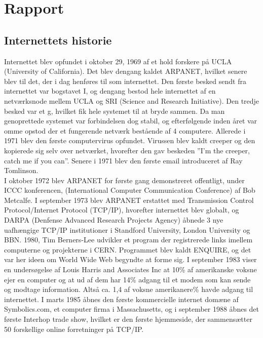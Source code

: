 \chapter{Rapport}

    \section{Internettets historie}
        Internettet blev opfundet i oktober 29, 1969 af et hold forskere på UCLA (University of California). Det blev dengang kaldet ARPANET, hvilket senere blev til det, der i dag henføres til som internettet. 
        Den første besked sendt fra internettet var bogstavet I, og dengang bestod hele internettet af en netværksnode mellem UCLA og SRI (Science and Research Initiative). 
        Den tredje besked var et g, hvilket fik hele systemet til at bryde sammen. 
        Da man genoprettede systemet var forbindelsen dog stabil, og efterfølgende inden året var omme opstod der et fungerende netværk bestående af 4 computere.
        Allerede i 1971 blev den første computervirus opfundet. Virussen blev kaldt creeper og den kopierede sig selv over netværket, hvorefter den gav beskeden ”I’m the creeper, catch me if you can”. Senere i 1971 blev den første email introduceret af Ray Tomlinson.\\
        I oktober 1972 blev ARPANET for første gang demonstreret offentligt, under ICCC konferencen, (International Computer Communication Conference) af Bob Metcalfe. I september 1973 blev ARPANET erstattet med Transmission Control Protocol/Internet Protocol (TCP/IP), hvorefter internettet blev globalt, og DARPA (Denfense Advanced Research Projects Agency) åbnede 3 nye uafhængige TCP/IP institutioner i Standford University, London University og BBN.
        1980, Tim Berners-Lee udvikler et program der registrerede links imellem computerne og projekterne i CERN. 
        Programmet blev kaldt ENQUIRE, og det var her ideen om World Wide Web begyndte at forme sig. I september 1983 viser en undersøgelse af Louis Harris and Associates Inc at 10\% af amerikanske voksne ejer en computer og at ud af dem har 14\% adgang til et modem som kan sende og modtage information. 
        Altså ca. 1,4 af voksne amerikanere\% havde adgang til internettet. 
        I marts 1985 åbnes den første kommercielle internet domæne af Symbolics.com, et computer firma i Massachusetts, og
        i september 1988 åbnes det første Interhop trade show, hvilket er den første hjemmeside, der sammensætter 50 forskellige online forretninger på TCP/IP.\\
